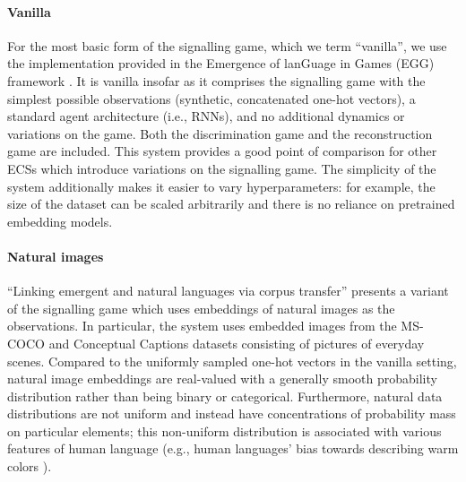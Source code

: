 \paragraph{Vanilla}
For the most basic form of the signalling game, which we term ``vanilla'', we use the implementation provided in the Emergence of lanGuage in Games (EGG) framework \citep[MIT license]{kharitonov-etal-2019-egg}.
It is vanilla insofar as it comprises the signalling game with the simplest possible observations (synthetic, concatenated one-hot vectors), a standard agent architecture (i.e., RNNs), and no additional dynamics or variations on the game.
Both the discrimination game and the reconstruction game are included.
This system provides a good point of comparison for other ECSs which introduce variations on the signalling game.
The simplicity of the system additionally makes it easier to vary hyperparameters: for example, the size of the dataset can be scaled arbitrarily and there is no reliance on pretrained embedding models.

\paragraph{Natural images}
``Linking emergent and natural languages via corpus transfer'' \citep[MIT license]{yao2022linking} presents a variant of the signalling game which uses embeddings of natural images as the observations.
In particular, the system uses embedded images from the MS-COCO and Conceptual Captions datasets consisting of pictures of everyday scenes.
Compared to the uniformly sampled one-hot vectors in the vanilla setting,
  natural image embeddings are real-valued with a generally smooth probability distribution rather than being binary or categorical.
Furthermore, natural data distributions are not uniform  and instead have concentrations of probability mass on particular elements; this non-uniform distribution is associated with various features of human language (e.g., human languages' bias towards describing warm colors \citep{gibson2017color,zaslavsky2018color}).


